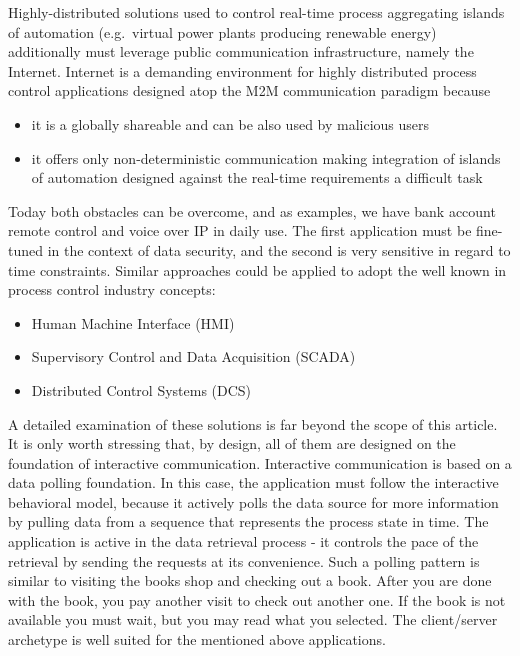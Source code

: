 \documentclass{article}
\begin{document}
Highly-distributed solutions used to control real-time process aggregating islands of automation (e.g.~virtual power plants producing renewable energy) additionally must leverage public communication infrastructure, namely the Internet. Internet is a demanding environment for highly distributed process control applications designed atop the M2M communication paradigm because

\begin{itemize}
      \item it is a globally shareable and can be also used by malicious users
      \item it offers only non-deterministic communication making integration of islands of automation designed against the real-time requirements a difficult task
\end{itemize}

Today both obstacles can be overcome, and as examples, we have bank account remote control and voice over IP in daily use. The first application must be fine-tuned in the context of data security, and the second is very sensitive in regard to time constraints. Similar approaches could be applied to adopt the well known in process control industry concepts:

\begin{itemize}
      \item  Human Machine Interface (HMI)
      \item Supervisory Control and Data Acquisition (SCADA)
      \item Distributed Control Systems (DCS)
\end{itemize}

A detailed examination of these solutions is far beyond the scope of this article. It is only worth stressing that, by design, all of them are designed on the foundation of interactive communication. Interactive communication is based on a data polling foundation. In this case, the application must follow the interactive behavioral model, because it actively polls the data source for more information by pulling data from a sequence that represents the process state in time. The application is active in the data retrieval process - it controls the pace of the retrieval by sending the requests at its convenience. Such a polling pattern is similar to visiting the books shop and checking out a book. After you are done with the book, you pay another visit to check out another one. If the book is not available you must wait, but you may read what you selected. The client/server archetype is well suited for the mentioned above applications.
\end{document}
